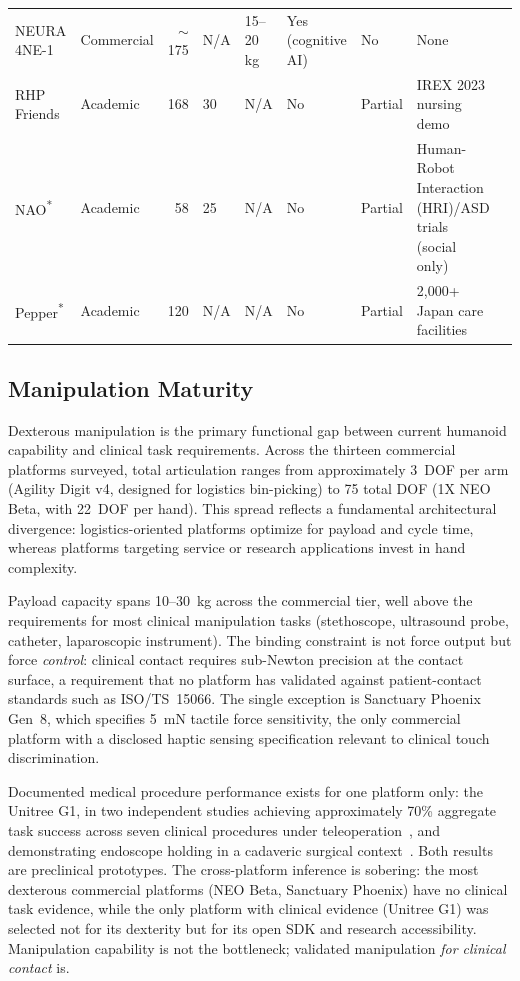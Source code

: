 \documentclass[acmjour]{acmart}
\begin{document}
\begin{table}[t]
{\begin{tabular}{@{}llrllllll@{}}
    NEURA 4NE-1      & Commercial & $\sim$175 & N/A      & 15--20\,kg & Yes (cognitive AI)   & No      & None \\
    RHP Friends      & Academic   & 168 & 30             & N/A        & No                    & Partial & IREX 2023 nursing demo~\cite{benallegue2025rhp} \\
    NAO\textsuperscript{*} & Academic & 58 & 25         & N/A   & No                    & Partial & Human-Robot Interaction (HRI)/ASD trials (social only) \\
    Pepper\textsuperscript{*} & Academic & 120 & N/A   & N/A        & No                    & Partial & 2,000+ Japan care facilities \\
    \bottomrule
  \end{tabular}%
  }
\end{table}

\subsection{Manipulation Maturity}
\label{sec:manipmaturity}

Dexterous manipulation is the primary functional gap between current humanoid
capability and clinical task requirements. Across the thirteen commercial platforms
surveyed, total articulation ranges from approximately 3~DOF per arm (Agility
Digit v4, designed for logistics bin-picking) to 75 total DOF (1X NEO Beta, with
22~DOF per hand). This spread reflects a fundamental architectural divergence:
logistics-oriented platforms optimize for payload and cycle time, whereas
platforms targeting service or research applications invest in hand complexity.

Payload capacity spans 10--30~kg across the commercial tier, well above the
requirements for most clinical manipulation tasks (stethoscope, ultrasound probe,
catheter, laparoscopic instrument). The binding constraint is not force output
but force \emph{control}: clinical contact requires sub-Newton precision at the
contact surface, a requirement that no platform has validated against patient-contact
standards such as ISO/TS~15066. The single exception is Sanctuary Phoenix Gen~8,
which specifies 5~mN tactile force sensitivity, the only commercial platform with
a disclosed haptic sensing specification relevant to clinical touch discrimination.

Documented medical procedure performance exists for one platform only: the
Unitree G1, in two independent studies achieving approximately 70\% aggregate
task success across seven clinical procedures under teleoperation~\cite{atar2025humanoids},
and demonstrating endoscope holding in a cadaveric surgical context~\cite{cho2026humanoid}.
Both results are preclinical prototypes. The cross-platform inference is sobering:
the most dexterous commercial platforms (NEO Beta, Sanctuary Phoenix) have no
clinical task evidence, while the only platform with clinical evidence (Unitree G1)
was selected not for its dexterity but for its open SDK and research accessibility.
Manipulation capability is not the bottleneck; validated manipulation \emph{for
clinical contact} is.
\end{document}
